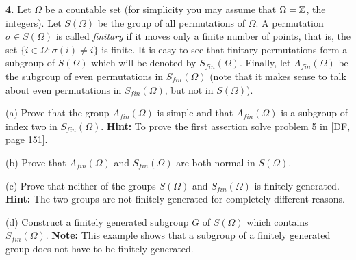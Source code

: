 \documentclass[12pt]{article}
\begin{document}
\skv
{\bf 4.} Let $\Omega$ be a countable set (for simplicity you may assume that $\Omega={\mathbb Z}$,
the integers). Let $S(\Omega)$ be the group of all permutations of $\Omega$.
A permutation $\sigma\in S(\Omega)$ is called {\it finitary} if it moves
only a finite number of points, that is, the set $\{i\in\Omega : \sigma(i)\neq i\}$
is finite. It is easy to see that finitary permutations form a subgroup of $S(\Omega)$
which will be denoted by $S_{fin}(\Omega)$. Finally, let $A_{fin}(\Omega)$ be the subgroup
of even permutations in $S_{fin}(\Omega)$ (note that it makes sense to talk about
even permutations in $S_{fin}(\Omega)$, but not in $S(\Omega)$).

(a) Prove that the group $A_{fin}(\Omega)$ is simple and that $A_{fin}(\Omega)$
is a subgroup of index two in $S_{fin}(\Omega)$. {\bf Hint:} To prove the first
assertion solve problem 5 in [DF, page 151].

(b) Prove that $A_{fin}(\Omega)$ and $S_{fin}(\Omega)$ are both normal in $S(\Omega)$.

(c) Prove that neither of the groups $S(\Omega)$ and $S_{fin}(\Omega)$ is finitely generated. {\bf Hint:} The two groups are not finitely generated for completely
different reasons.

(d) Construct a finitely generated subgroup $G$ of $S(\Omega)$ which contains
$S_{fin}(\Omega)$. {\bf Note:} This example shows that a subgroup of a finitely
generated group does not have to be finitely generated.
\end{document}
